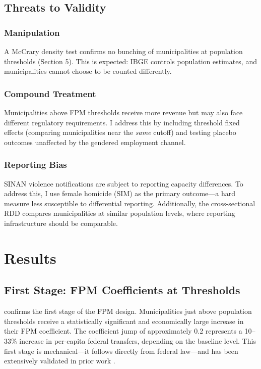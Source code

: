 \documentclass[12pt]{article}
\begin{document}
\subsection{Threats to Validity}

\subsubsection*{Manipulation} A McCrary density test \citep{mccrary2008manipulation} confirms no bunching of municipalities at population thresholds (Section 5). This is expected: IBGE controls population estimates, and municipalities cannot choose to be counted differently.

\subsubsection*{Compound Treatment} Municipalities above FPM thresholds receive more revenue but may also face different regulatory requirements. I address this by including threshold fixed effects (comparing municipalities near the \textit{same} cutoff) and testing placebo outcomes unaffected by the gendered employment channel.

\subsubsection*{Reporting Bias} SINAN violence notifications are subject to reporting capacity differences. To address this, I use female homicide (SIM) as the primary outcome---a hard measure less susceptible to differential reporting. Additionally, the cross-sectional RDD compares municipalities at similar population levels, where reporting infrastructure should be comparable.

\section{Results}

\subsection{First Stage: FPM Coefficients at Thresholds}



 confirms the first stage of the FPM design. Municipalities just above population thresholds receive a statistically significant and economically large increase in their FPM coefficient. The coefficient jump of approximately 0.2 represents a 10--33\% increase in per-capita federal transfers, depending on the baseline level. This first stage is mechanical---it follows directly from federal law---and has been extensively validated in prior work \citep{brollo2013federal, litschig2013impact, corbi2019fiscal}.
\end{document}
